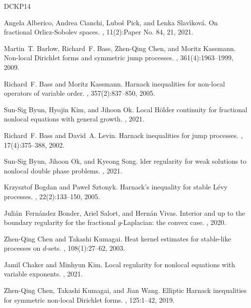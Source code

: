 \documentclass[11pt]{amsart}
\theoremstyle{plain}
\theoremstyle{definition}
\numberwithin{equation}{section}
\begin{document}
\begin{thebibliography}{DCKP14}

Angela Alberico, Andrea Cianchi, Lubo\v{s} Pick, and Lenka Slav\'{\i}kov\'{a}.
\newblock On fractional {O}rlicz-{S}obolev spaces.
, 11(2):Paper No. 84, 21, 2021.

Martin~T. Barlow, Richard~F. Bass, Zhen-Qing Chen, and Moritz Kassmann.
\newblock Non-local {D}irichlet forms and symmetric jump processes.
, 361(4):1963--1999, 2009.

Richard~F. Bass and Moritz Kassmann.
\newblock Harnack inequalities for non-local operators of variable order.
, 357(2):837--850, 2005.

Sun-Sig Byun, Hyojin Kim, and Jihoon Ok.
\newblock Local {H}{\"o}lder continuity for fractional nonlocal equations with
  general growth.
, 2021.

Richard~F. Bass and David~A. Levin.
\newblock Harnack inequalities for jump processes.
, 17(4):375--388, 2002.

Sun-Sig Byun, Jihoon Ok, and Kyeong Song.
lder regularity for weak solutions to nonlocal double phase
  problems.
, 2021.

Krzysztof Bogdan and Pawe\l{} Sztonyk.
\newblock Harnack's inequality for stable {L}\'{e}vy processes.
, 22(2):133--150, 2005.

Juli{\'a}n~Fern{\'a}ndez Bonder, Ariel Salort, and Hern{\'a}n Vivas.
\newblock Interior and up to the boundary regularity for the fractional
  $g$-{L}aplacian: the convex case.
, 2020.

Zhen-Qing Chen and Takashi Kumagai.
\newblock Heat kernel estimates for stable-like processes on {$d$}-sets.
, 108(1):27--62, 2003.

Jamil Chaker and Minhyun Kim.
\newblock Local regularity for nonlocal equations with variable exponents.
, 2021.

Zhen-Qing Chen, Takashi Kumagai, and Jian Wang.
\newblock Elliptic {H}arnack inequalities for symmetric non-local {D}irichlet
  forms.
, 125:1--42, 2019.


\end{thebibliography}
\end{document}

